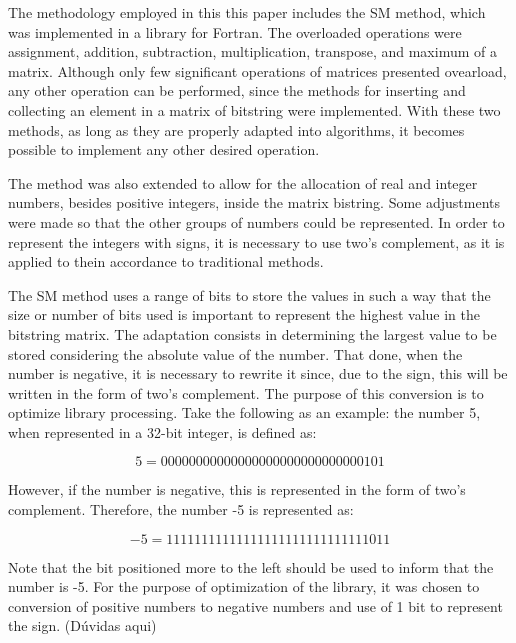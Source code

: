 \documentclass[10pt]{article}
\begin{document}
The methodology employed in this this paper includes the SM method, which was implemented in a library for Fortran. The 
overloaded operations were assignment, addition, subtraction, multiplication, transpose, and maximum of a matrix. 
Although only few significant operations of matrices presented ovearload, any other operation can be performed, since 
the methods for inserting and collecting an element in a matrix of bitstring were implemented. With these two methods, 
as long as they are properly adapted into algorithms, it becomes possible to implement any other desired operation.

The method was also extended to allow for the allocation of real and integer numbers, besides positive integers, inside 
the matrix bistring. Some adjustments were made so that the other groups of numbers could be represented. In order to 
represent the integers with signs, it is necessary to use two's complement, as it is applied to thein accordance to 
traditional methods.

The SM method uses a range of bits to store the values in such a way that
the size or number of bits used is important to represent the highest value in the bitstring matrix. The adaptation 
consists in determining the largest value to be stored considering the absolute value of the number. That done,
when the number is negative, it is necessary to rewrite it since, due to the sign, this will be written in the form of 
two's complement. The purpose of this conversion is to optimize library processing. Take the following as an example: 
the number 5, when represented in a 32-bit integer, is defined as:

\begin{equation}\nonumber
 5 = 00000000 00000000 00000000 00000101
\end{equation}

However, if the number is negative, this is represented in the form of two's complement. Therefore, the number -5 is 
represented as:

\begin{equation}\nonumber
 -5 = 11111111 11111111 11111111 11111011
\end{equation}

Note that the bit positioned more to the left should be used to inform that the number is -5. For the purpose of 
optimization of the library, it was chosen to conversion of positive numbers to negative numbers and use of 1 
bit to represent the sign. (Dúvidas aqui)
\end{document}
